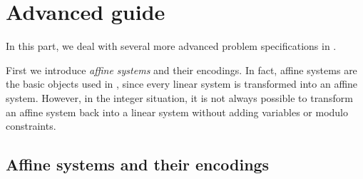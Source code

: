 %
%
%

\chapter{Advanced guide}

In this part, we deal with several more advanced problem
specifications in \FourTiTwo{}.

First we introduce \emph{affine systems} and their encodings. In
fact, affine systems are the basic objects used in \FourTiTwo{},
since every linear system is transformed into an affine system.
However, in the integer situation, it is not always possible to
transform an affine system back into a linear system without adding
variables or modulo constraints.




\section{Affine systems and their encodings}




